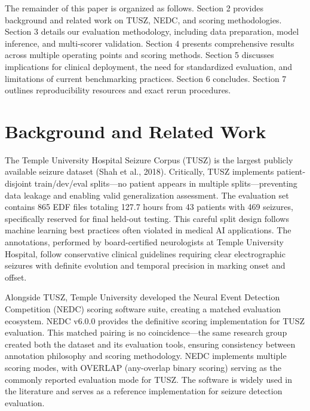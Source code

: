 \documentclass[
  10pt,
]{article}
\begin{document}
The remainder of this paper is organized as follows. Section 2 provides
background and related work on TUSZ, NEDC, and scoring methodologies.
Section 3 details our evaluation methodology, including data
preparation, model inference, and multi-scorer validation. Section 4
presents comprehensive results across multiple operating points and
scoring methods. Section 5 discusses implications for clinical
deployment, the need for standardized evaluation, and limitations of
current benchmarking practices. Section 6 concludes. Section 7 outlines
reproducibility resources and exact rerun procedures.



\hypertarget{background-and-related-work}{%
\section{Background and Related
Work}\label{background-and-related-work}}

The Temple University Hospital Seizure Corpus (TUSZ) is the largest
publicly available seizure dataset (Shah et al., 2018). Critically, TUSZ
implements patient-disjoint train/dev/eval splits---no patient appears
in multiple splits---preventing data leakage and enabling valid
generalization assessment. The evaluation set contains 865 EDF files
totaling 127.7 hours from 43 patients with 469 seizures, specifically
reserved for final held-out testing. This careful split design follows
machine learning best practices often violated in medical AI
applications. The annotations, performed by board-certified neurologists
at Temple University Hospital, follow conservative clinical guidelines
requiring clear electrographic seizures with definite evolution and
temporal precision in marking onset and offset.

Alongside TUSZ, Temple University developed the Neural Event Detection
Competition (NEDC) scoring software suite, creating a matched evaluation
ecosystem. NEDC v6.0.0 provides the definitive scoring implementation
for TUSZ evaluation. This matched pairing is no coincidence---the same
research group created both the dataset and its evaluation tools,
ensuring consistency between annotation philosophy and scoring
methodology. NEDC implements multiple scoring modes, with OVERLAP
(any-overlap binary scoring) serving as the commonly reported evaluation
mode for TUSZ. The software is widely used in the literature and serves
as a reference implementation for seizure detection evaluation.
\end{document}
